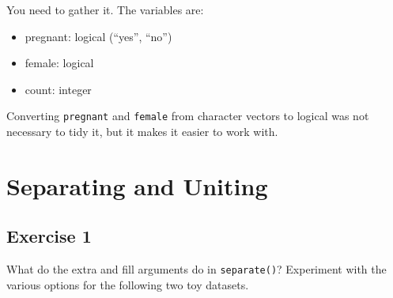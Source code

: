 \documentclass[]{book}
\newenvironment{Shaded}{\begin{snugshade}}{\end{snugshade}}
\newcommand{\CommentTok}[1]{\textcolor[rgb]{0.56,0.35,0.01}{\textit{#1}}}
\newcommand{\DataTypeTok}[1]{\textcolor[rgb]{0.13,0.29,0.53}{#1}}
\newcommand{\KeywordTok}[1]{\textcolor[rgb]{0.13,0.29,0.53}{\textbf{#1}}}
\newcommand{\NormalTok}[1]{#1}
\newcommand{\OperatorTok}[1]{\textcolor[rgb]{0.81,0.36,0.00}{\textbf{#1}}}
\newcommand{\StringTok}[1]{\textcolor[rgb]{0.31,0.60,0.02}{#1}}
\providecommand{\tightlist}{%
  \setlength{\itemsep}{0pt}\setlength{\parskip}{0pt}}
\theoremstyle{definition}
\theoremstyle{definition}
\theoremstyle{definition}
\theoremstyle{remark}
\begin{document}
You need to gather it. The variables are:

\begin{itemize}
\tightlist
\item
  pregnant: logical (``yes'', ``no'')
\item
  female: logical
\item
  count: integer
\end{itemize}

\begin{Shaded}
\end{Shaded}

Converting \texttt{pregnant} and \texttt{female} from character vectors
to logical was not necessary to tidy it, but it makes it easier to work
with.

\hypertarget{separating-and-uniting}{%
\section{Separating and Uniting}\label{separating-and-uniting}}

\hypertarget{exercise-1-18}{%
\subsection{Exercise 1}\label{exercise-1-18}}

What do the extra and fill arguments do in \texttt{separate()}?
Experiment with the various options for the following two toy datasets.
\end{document}
